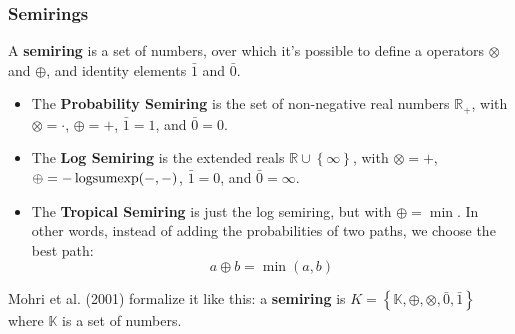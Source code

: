 \documentclass{beamer}
\newcommand{\logsumexp}{\operatornamewithlimits{logsumexp}}
\begin{document}
\begin{frame}
  \frametitle{Semirings}

  A {\bf semiring} is a set of numbers, over which it's possible to
  define a operators $\otimes$ and $\oplus$,
  and identity elements $\bar{1}$ and $\bar{0}$.
  \begin{itemize}
  \item The {\bf Probability Semiring} is the set of non-negative real
    numbers $\mathbb{R}_+$, with $\otimes=\cdot$, $\oplus=+$, $\bar{1}=1$, and $\bar{0}=0$.
  \item The {\bf Log Semiring} is the extended reals
    $\mathbb{R}\cup\left\{\infty\right\}$, with $\otimes=+$, $\oplus
    =-\logsumexp(-,-)$, $\bar{1}=0$, and $\bar{0}=\infty$.
  \item The {\bf Tropical Semiring} is just the log semiring, but with
    $\oplus=\min$.  In other words, instead of adding the
    probabilities of two paths, we choose the best path:
    \begin{displaymath}
      a\oplus b = \min(a,b)
    \end{displaymath}
  \end{itemize}
  Mohri et al. (2001) formalize it like this: a {\bf semiring} is
  $K=\left\{\mathbb{K},\oplus,\otimes,\bar{0},\bar{1}\right\}$ where
  $\mathbb{K}$ is a set of numbers.
\end{frame}
  
\end{document}
